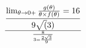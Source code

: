 \documentclass[preview]{standalone}
\begin{document}
\begin{align*}
\lim_{\theta \to 0 +} {g( \theta ) \over {\theta \times f( \theta )}} =  16 \over 9 \sqrt(3)} \over {8 \over 3  = {2 \sqrt{3} \over 9}
\end{align*}
\end{document}
